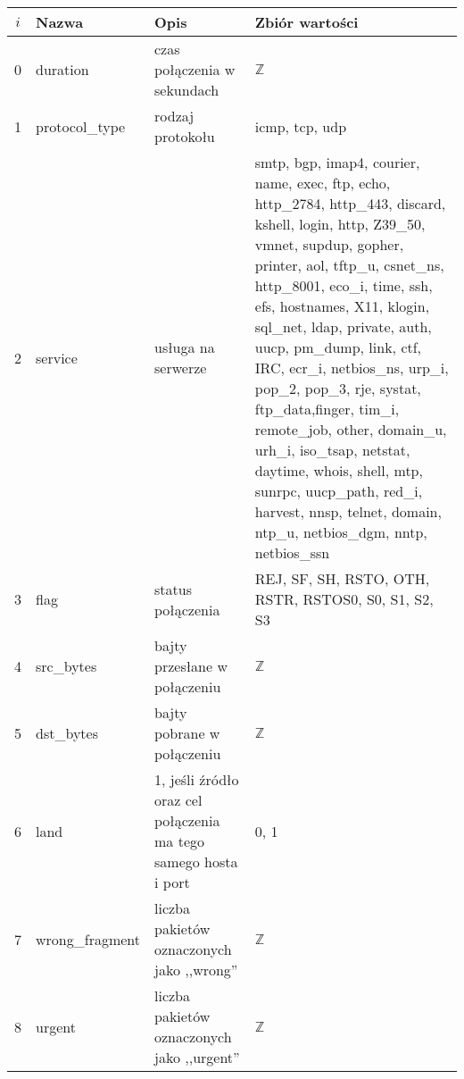 \documentclass[a4paper, 12pt]{article}
\begin{document}
\begin{tabular}{ | c | p{3cm} | p{3cm} | p{6cm} | } \hline
$i$ & Nazwa & Opis & Zbiór wartości \\ \hline
0      & duration & czas połączenia w sekundach & $\mathbb{Z}$ \\ \hline
1      & protocol\_type & rodzaj protokołu & icmp, tcp, udp \\ \hline
2      & service & usługa na serwerze & smtp, bgp, imap4, courier, name, exec, ftp, echo, http\_2784,
                       http\_443, discard, kshell, login, http, Z39\_50, vmnet, supdup,
                       gopher, printer, aol, tftp\_u, csnet\_ns, http\_8001, eco\_i, time,
                       ssh, efs, hostnames, X11, klogin, sql\_net, ldap, private,
                       auth, uucp, pm\_dump, link, ctf, IRC, ecr\_i, netbios\_ns, urp\_i,
                       pop\_2, pop\_3, rje, systat, ftp\_data,finger, tim\_i, remote\_job,
                       other, domain\_u, urh\_i, iso\_tsap, netstat, daytime, whois, shell,
                       mtp, sunrpc, uucp\_path, red\_i, harvest, nnsp, telnet, domain,
                       ntp\_u, netbios\_dgm, nntp, netbios\_ssn \\ \hline
3      & flag & status połączenia & REJ, SF, SH, RSTO, OTH, RSTR, RSTOS0, S0, S1, S2, S3 \\ \hline
4      & src\_bytes  & bajty przesłane w połączeniu & $\mathbb{Z}$ \\ \hline
5      & dst\_bytes  & bajty pobrane w połączeniu  & $\mathbb{Z}$ \\ \hline
6      & land & 1, jeśli źródło oraz cel połączenia ma tego samego hosta i port & 0, 1 \\ \hline
7      & wrong\_fragment  & liczba pakietów oznaczonych jako ,,wrong'' & $\mathbb{Z}$ \\ \hline
8      & urgent  & liczba pakietów oznaczonych jako ,,urgent''  & $\mathbb{Z}$ \\ \hline
\end{tabular}
\end{document}
